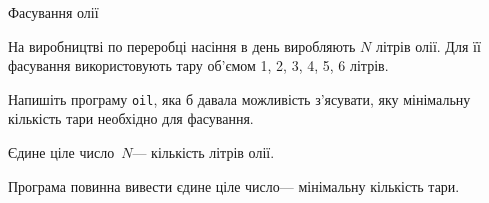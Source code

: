 \begin{problemAllDefault}{Фасування олії}

На виробництві по переробці насіння в день виробляють $N$ літрів олії. Для її фасування використовують тару об’ємом 1, 2, 3, 4, 5, 6 літрів.

Напишіть програму \texttt{oil}, яка б давала можливість з’ясувати, яку мінімальну кількість тари необхідно для фасування.

\InputFile	
Єдине ціле число~$N$\nolinebreak[3] --- кількість літрів олії.

\OutputFile	
Програма повинна вивести єдине ціле число\nolinebreak[3] --- мінімальну кількість тари.

\ifAfour\else
\vspace{-\baselineskip}
\fi

\Examples
\ifAfour
\par
\fi
\begin{exampleSimple}{5em}{3em}%
%
\ifAfour%
\end{exampleSimple}%
\hspace{-1em}%
\begin{exampleSimple}{5em}{3em}%
\fi%
%
\ifAfour%
\end{exampleSimple}%
\hspace{-1em}%
\begin{exampleSimple}{5em}{3em}%
\fi%
%
\end{exampleSimple}

\end{problemAllDefault}